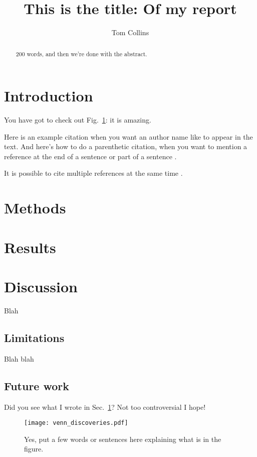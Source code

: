 \documentclass[12pt,a4paper]{article}
\title{This is the title: Of my report}
\author{Tom Collins}
\begin{document}
\maketitle

\begin{abstract}
    200 words, and then we're done with the abstract.
\end{abstract}

\section{Introduction}\label{sec:intro}
You have got to check out Fig.~\ref{fig:venn}: it is amazing.

Here is an example citation when you want an author name like \cite{collins2011a} to appear in the text. And here's how to do a parenthetic citation, when you want to mention a reference at the end of a sentence or part of a sentence \citep{collins2013}.

It is possible to cite multiple references at the same time \citep{collins2011b,collins2016,lunn2007a,lunn2007b,ross2006,shannon1948}.

\section{Methods}\label{sec:methods}

\section{Results}\label{sec:result}

\section{Discussion}\label{sec:discussion}

Blah

\subsection{Limitations}\label{sec:limitations}

Blah blah

\subsection{Future work}\label{sec:future}

Did you see what I wrote in Sec.~\ref{sec:intro}? Not too controversial I hope!

\begin{figure}[htbp!]
\begin{center}
\texttt{[image: venn\_discoveries.pdf]}
\end{center}
\caption{Yes, put a few words or sentences here explaining what is in the figure.}
\label{fig:venn}
\end{figure}



\end{document}

